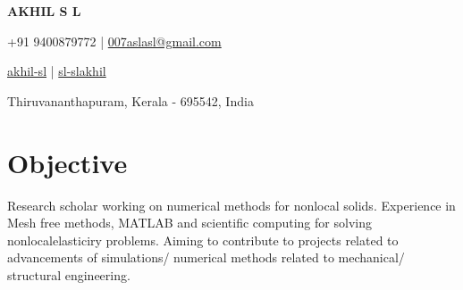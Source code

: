 \documentclass[a4paper,11pt]{article}
\newcommand{\socialicon}[1]{\raisebox{-0.05em}{\resizebox{!}{1em}{#1}}}
\newcommand{\headerfontiii}{\fontfamily{ppl}\selectfont} %
\begin{document}
	\headerfontiii
	
	\begin{center}
		{\Huge\textbf{AKHIL S L}}
	\end{center}
	\vspace{-6mm}
	
	\begin{center}
		\small{
			+91 9400879772 | \href{mailto:007aslasl@gmail.com}{007aslasl@gmail.com} 
		}
	\end{center}
	\vspace{-6mm}
	
	\begin{center}
		\small{
			\socialicon{\faLinkedin} \href{https://www.linkedin.com/in/akhil-sl-88a697b9/}{akhil-sl} | 
			\socialicon{\faGithub} \href{https://github.com/sl-slakhil}{sl-slakhil} 
		}
	\end{center}
	\vspace{-6mm}
	\begin{center}
		\small{Thiruvananthapuram, Kerala - 695542, India}
	\end{center}
	
	\vspace{-4mm}
	
	\section{\textbf{Objective}}
	\vspace{1mm}
	\small{
		Research scholar working on numerical methods for nonlocal solids. Experience in Mesh free methods, MATLAB and scientific computing for solving nonlocalelasticiry problems. Aiming to contribute to projects related to advancements of simulations/ numerical methods related to mechanical/ structural engineering.
	}
	\vspace{-2mm}
	
	
	
\end{document}
